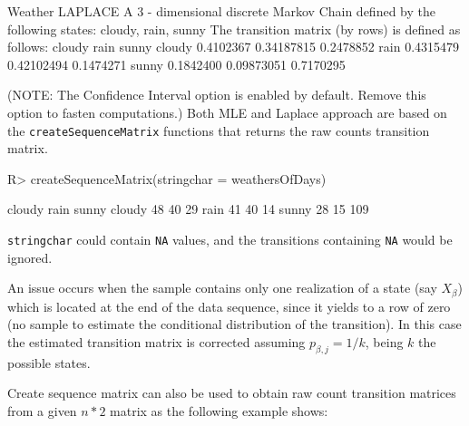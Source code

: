 \documentclass[
  nojss]{jss}
\begin{document}
\begin{CodeChunk}


\begin{CodeOutput}
Weather LAPLACE 
 A  3 - dimensional discrete Markov Chain defined by the following states: 
 cloudy, rain, sunny 
 The transition matrix  (by rows)  is defined as follows: 
          cloudy       rain     sunny
cloudy 0.4102367 0.34187815 0.2478852
rain   0.4315479 0.42102494 0.1474271
sunny  0.1842400 0.09873051 0.7170295
\end{CodeOutput}
\end{CodeChunk}

(NOTE: The Confidence Interval option is enabled by default. Remove this option to fasten computations.) Both MLE and Laplace approach are based on the \texttt{createSequenceMatrix} functions that returns the raw counts transition matrix.

\begin{CodeChunk}

\begin{CodeInput}
R> createSequenceMatrix(stringchar = weathersOfDays)
\end{CodeInput}

\begin{CodeOutput}
       cloudy rain sunny
cloudy     48   40    29
rain       41   40    14
sunny      28   15   109
\end{CodeOutput}
\end{CodeChunk}

\texttt{stringchar} could contain \texttt{NA} values, and the transitions containing \texttt{NA} would be ignored.

An issue occurs when the sample contains only one realization of a state (say \(X_{\beta}\)) which is located at the end of the data sequence, since it yields to a row of zero (no sample to estimate the conditional distribution of the transition). In this case the estimated transition matrix is corrected assuming \(p_{\beta,j}=1/k\), being \(k\) the possible states.

Create sequence matrix can also be used to obtain raw count transition matrices from a given \(n*2\) matrix as the following example shows:
\end{document}
